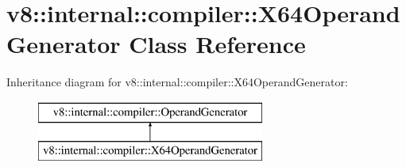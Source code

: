 \hypertarget{classv8_1_1internal_1_1compiler_1_1_x64_operand_generator}{}\section{v8\+:\+:internal\+:\+:compiler\+:\+:X64\+Operand\+Generator Class Reference}
\label{classv8_1_1internal_1_1compiler_1_1_x64_operand_generator}
Inheritance diagram for v8\+:\+:internal\+:\+:compiler\+:\+:X64\+Operand\+Generator\+:\begin{figure}[H]
\begin{center}
\leavevmode
\includegraphics[height=2.000000cm]{classv8_1_1internal_1_1compiler_1_1_x64_operand_generator}
\end{center}
\end{figure}
